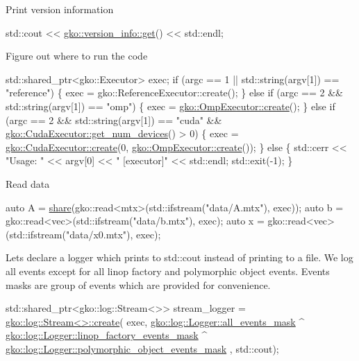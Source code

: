 Print version information


\begin{DoxyCode}
std::cout << \hyperlink{classgko_1_1version__info_a6daeb8a087cfb57fa055526fc133d8eb}{gko::version\_info::get}() << std::endl;
\end{DoxyCode}


Figure out where to run the code


\begin{DoxyCode}
std::shared\_ptr<gko::Executor> exec;
\textcolor{keywordflow}{if} (argc == 1 || std::string(argv[1]) == \textcolor{stringliteral}{"reference"}) \{
    exec = gko::ReferenceExecutor::create();
\} \textcolor{keywordflow}{else} \textcolor{keywordflow}{if} (argc == 2 && std::string(argv[1]) == \textcolor{stringliteral}{"omp"}) \{
    exec = \hyperlink{classgko_1_1OmpExecutor_a33ca05fdd0fc928ee262fc9425304874}{gko::OmpExecutor::create}();
\} \textcolor{keywordflow}{else} \textcolor{keywordflow}{if} (argc == 2 && std::string(argv[1]) == \textcolor{stringliteral}{"cuda"} &&
           \hyperlink{classgko_1_1CudaExecutor_aef0258494d14de0e56149b920c5173e5}{gko::CudaExecutor::get\_num\_devices}() > 0) \{
    exec = \hyperlink{classgko_1_1CudaExecutor_a2718a92034350650ef406ffdb60db090}{gko::CudaExecutor::create}(0, 
      \hyperlink{classgko_1_1OmpExecutor_a33ca05fdd0fc928ee262fc9425304874}{gko::OmpExecutor::create}());
\} \textcolor{keywordflow}{else} \{
    std::cerr << \textcolor{stringliteral}{"Usage: "} << argv[0] << \textcolor{stringliteral}{" [executor]"} << std::endl;
    std::exit(-1);
\}
\end{DoxyCode}


Read data


\begin{DoxyCode}
\textcolor{keyword}{auto} A = \hyperlink{namespacegko_a3ce296f73db0ff398bdea6009a3a5c58}{share}(gko::read<mtx>(std::ifstream(\textcolor{stringliteral}{"data/A.mtx"}), exec));
\textcolor{keyword}{auto} b = gko::read<vec>(std::ifstream(\textcolor{stringliteral}{"data/b.mtx"}), exec);
\textcolor{keyword}{auto} x = gko::read<vec>(std::ifstream(\textcolor{stringliteral}{"data/x0.mtx"}), exec);
\end{DoxyCode}


Let\textquotesingle{}s declare a logger which prints to std\+::cout instead of printing to a file. We log all events except for all linop factory and polymorphic object events. Events masks are group of events which are provided for convenience.


\begin{DoxyCode}
std::shared\_ptr<gko::log::Stream<>> stream\_logger =
    \hyperlink{classgko_1_1log_1_1Stream_a71f96d3f1cd7c03875476cd8db98145b}{gko::log::Stream<>::create}(
        exec,
        \hyperlink{classgko_1_1log_1_1Logger_a02534863a2d2f92dfeb2c39038365532}{gko::log::Logger::all\_events\_mask} ^
            \hyperlink{classgko_1_1log_1_1Logger_ad6fb77d4d5610bc7299087f7149a7f16}{gko::log::Logger::linop\_factory\_events\_mask} ^
            \hyperlink{classgko_1_1log_1_1Logger_a5fb997f1c06c0602103d8dab616a96bc}{gko::log::Logger::polymorphic\_object\_events\_mask}
      ,
        std::cout);
\end{DoxyCode}


